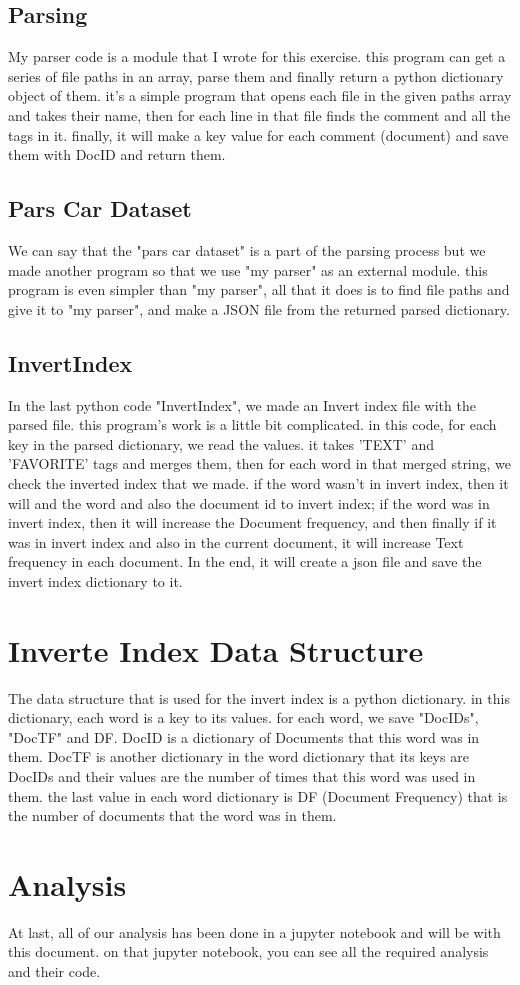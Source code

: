 \documentclass[a4paper]{article}
\begin{document}
	\subsection{Parsing}
	My parser code is a module that I wrote for this exercise. this program can get a series of file paths in an array, parse them and finally return a python dictionary object of them. it's a simple program that opens each file in the given paths array and takes their name, then for each line in that file finds the comment and all the tags in it. finally, it will make a key value for each comment (document) and save them with DocID and return them.
	
	\subsection{Pars Car Dataset}
	We can say that the "pars car dataset" is a part of the parsing process but we made another program so that we use "my parser" as an external module. this program is even simpler than "my parser", all that it does is to find file paths and give it to "my parser", and make a JSON file from the returned parsed dictionary.
	
	\subsection{InvertIndex}
	In the last python code "InvertIndex", we made an Invert index file with the parsed file. this program's work is a little bit complicated. in this code, for each key in the parsed dictionary, we read the values. it takes 'TEXT' and 'FAVORITE' tags and merges them, then for each word in that merged string, we check the inverted index that we made. if the word wasn't in invert index, then it will and the word and also the document id to invert index; if the word was in invert index, then it will increase the Document frequency, and then finally if it was in invert index and also in the current document, it will increase Text frequency in each document.
	In the end, it will create a json file and save the invert index dictionary to it.

\section{Inverte Index Data Structure}
	The data structure that is used for the invert index is a python dictionary. in this dictionary, each word is a key to its values. for each word, we save "DocIDs", "DocTF" and DF. DocID is a dictionary of Documents that this word was in them. DocTF is another dictionary in the word dictionary that its keys are DocIDs and their values are the number of times that this word was used in them. the last value in each word dictionary is DF (Document Frequency) that is the number of documents that the word was in them.
	

\section{Analysis}
	At last, all of our analysis has been done in a jupyter notebook and will be with this document. on that jupyter notebook, you can see all the required analysis and their code.
	
\end{document}
